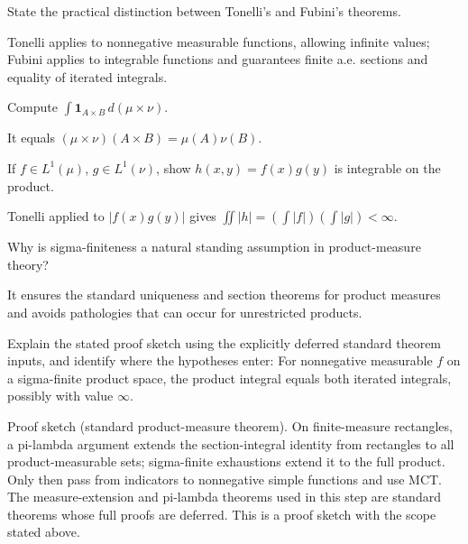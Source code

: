 \begin{problem}\label{prob:iii05-problem-05}
State the practical distinction between Tonelli's and Fubini's theorems.
\end{problem}
\begin{solution}
Tonelli applies to nonnegative measurable functions, allowing infinite
values; Fubini applies to integrable functions and guarantees finite a.e.
sections and equality of iterated integrals.
\end{solution}

\begin{problem}\label{prob:iii05-problem-06}
Compute \(\int\mathbf1_{A\times B}\,d(\mu\times\nu)\).
\end{problem}
\begin{solution}
It equals \((\mu\times\nu)(A\times B)=\mu(A)\nu(B)\).
\end{solution}

\begin{problem}\label{prob:iii05-problem-07}
If \(f\in L^1(\mu)\), \(g\in L^1(\nu)\), show \(h(x,y)=f(x)g(y)\) is integrable on the product.
\end{problem}
\begin{solution}
Tonelli applied to \(|f(x)g(y)|\) gives
\(\iint|h|=(\int|f|)(\int|g|)<\infty\).
\end{solution}

\begin{problem}\label{prob:iii05-problem-08}
Why is sigma-finiteness a natural standing assumption in product-measure theory?
\end{problem}
\begin{solution}
It ensures the standard uniqueness and section theorems for product
measures and avoids pathologies that can occur for unrestricted products.
\end{solution}

\begin{problem}\label{prob:iii05-problem-09}
Explain the stated proof sketch using the explicitly deferred standard theorem inputs, and identify where the hypotheses enter: For nonnegative measurable $f$ on a sigma-finite product space, the product integral equals both iterated integrals, possibly with value $\infty$.
\end{problem}
\begin{solution}
Proof sketch (standard product-measure theorem). On finite-measure rectangles, a pi-lambda argument extends the section-integral identity from rectangles to all product-measurable sets; sigma-finite exhaustions extend it to the full product. Only then pass from indicators to nonnegative simple functions and use MCT. The measure-extension and pi-lambda theorems used in this step are standard theorems whose full proofs are deferred. This is a proof sketch with the scope stated above.
\end{solution}

